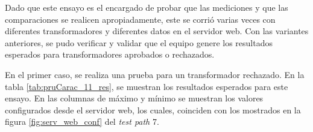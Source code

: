 Dado que este ensayo es el encargado de probar que las mediciones y que las comparaciones se realicen apropiadamente, este se corrió varias veces con diferentes transformadores y diferentes datos en el servidor web. Con las variantes anteriores, se pudo verificar y validar que el equipo genere los resultados esperados para transformadores aprobados o rechazados.

En el primer caso, se realiza una prueba para un transformador rechazado. En la tabla \ref{tab:pruCarac_11_res}, se muestran los resultados esperados para este ensayo. En las columnas de máximo y mínimo se muestran los valores configurados desde el servidor web, los cuales, coinciden con los mostrados en la figura \ref{fig:serv_web_conf} del \textit{test path} 7.

\begin{table}[htpb]
\centering
\caption[Ensayo para transformador rechazado]{Resultados esperados para el \textit{test path} 11 en la condición de transformador rechazado}
\label{tab:pruCarac_11_res}
\end{table}

